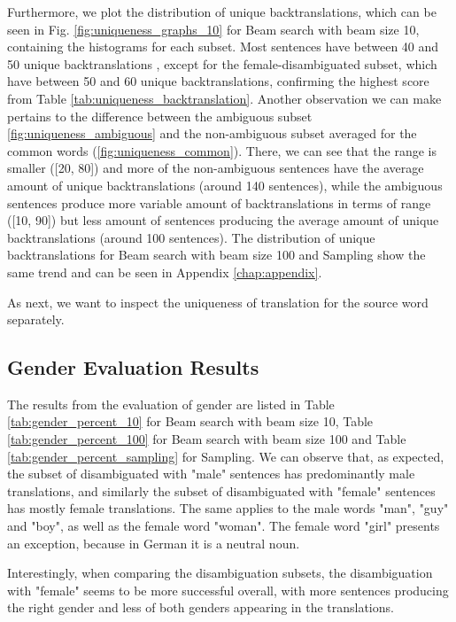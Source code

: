 Furthermore, we plot the distribution of unique backtranslations, which can be seen in Fig. \ref{fig:uniqueness_graphs_10} for Beam search with beam size 10, containing the histograms for each subset. 
Most sentences have between 40 and 50 unique backtranslations , except for the female-disambiguated subset, which have between 50 and 60 unique backtranslations, confirming the highest score from Table \ref{tab:uniqueness_backtranslation}. Another observation we can make pertains to the difference between the ambiguous subset \ref{fig:uniqueness_ambiguous} and the non-ambiguous subset averaged for the common words (\ref{fig:uniqueness_common}). There, we can see that the range is smaller ([20, 80]) and more of the non-ambiguous sentences have the average amount of unique backtranslations (around 140 sentences), while the ambiguous sentences produce more variable amount of backtranslations in terms of range  ([10, 90]) but less amount of sentences producing the average amount of unique backtranslations (around 100 sentences).
The distribution of unique backtranslations for Beam search with beam size 100 and Sampling show the same trend and can be seen in Appendix \ref{chap:appendix}.

As next, we want to inspect the uniqueness of translation for the source word separately.

\clearpage

\subsection{Gender Evaluation Results}
\label{ch:Base_Experiment:Results:Gender}

The results from the evaluation of gender are listed in Table \ref{tab:gender_percent_10} for Beam search with beam size 10, Table \ref{tab:gender_percent_100} for Beam search with beam size 100 and Table \ref{tab:gender_percent_sampling} for Sampling. We can observe that, as expected, the subset of disambiguated with "male" sentences has predominantly male translations, and similarly the subset of disambiguated with "female" sentences has mostly female translations. The same applies to the male words "man", "guy" and "boy", as well as the female word "woman". The female word "girl" presents an exception, because in German it is a neutral noun.

Interestingly, when comparing the disambiguation subsets, the disambiguation with "female" seems to be more successful overall, with more sentences producing the right gender and less of both genders appearing in the translations.

